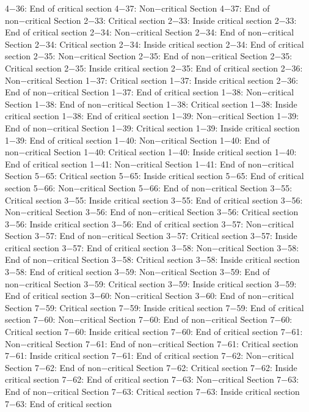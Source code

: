 4−36: End of critical section
4−37: Non−critical Section
4−37: End of non−critical Section
2−33: Critical section
2−33: Inside critical section
2−33: End of critical section
2−34: Non−critical Section
2−34: End of non−critical Section
2−34: Critical section
2−34: Inside critical section
2−34: End of critical section
2−35: Non−critical Section
2−35: End of non−critical Section
2−35: Critical section
2−35: Inside critical section
2−35: End of critical section
2−36: Non−critical Section
1−37: Critical section
1−37: Inside critical section
2−36: End of non−critical Section
1−37: End of critical section
1−38: Non−critical Section
1−38: End of non−critical Section
1−38: Critical section
1−38: Inside critical section
1−38: End of critical section
1−39: Non−critical Section
1−39: End of non−critical Section
1−39: Critical section
1−39: Inside critical section
1−39: End of critical section
1−40: Non−critical Section
1−40: End of non−critical Section
1−40: Critical section
1−40: Inside critical section
1−40: End of critical section
1−41: Non−critical Section
1−41: End of non−critical Section
5−65: Critical section
5−65: Inside critical section
5−65: End of critical section
5−66: Non−critical Section
5−66: End of non−critical Section
3−55: Critical section
3−55: Inside critical section
3−55: End of critical section
3−56: Non−critical Section
3−56: End of non−critical Section
3−56: Critical section
3−56: Inside critical section
3−56: End of critical section
3−57: Non−critical Section
3−57: End of non−critical Section
3−57: Critical section
3−57: Inside critical section
3−57: End of critical section
3−58: Non−critical Section
3−58: End of non−critical Section
3−58: Critical section
3−58: Inside critical section
3−58: End of critical section
3−59: Non−critical Section
3−59: End of non−critical Section
3−59: Critical section
3−59: Inside critical section
3−59: End of critical section
3−60: Non−critical Section
3−60: End of non−critical Section
7−59: Critical section
7−59: Inside critical section
7−59: End of critical section
7−60: Non−critical Section
7−60: End of non−critical Section
7−60: Critical section
7−60: Inside critical section
7−60: End of critical section
7−61: Non−critical Section
7−61: End of non−critical Section
7−61: Critical section
7−61: Inside critical section
7−61: End of critical section
7−62: Non−critical Section
7−62: End of non−critical Section
7−62: Critical section
7−62: Inside critical section
7−62: End of critical section
7−63: Non−critical Section
7−63: End of non−critical Section
7−63: Critical section
7−63: Inside critical section
7−63: End of critical section
